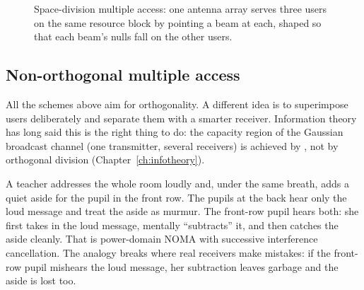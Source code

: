 \begin{figure}[H]\centering
{}
\caption{Space-division multiple access: one antenna array serves three users on the same resource block
by pointing a beam at each, shaped so that each beam's nulls fall on the other users.}
\label{fig:ch20_sdma}
\end{figure}

\subsection{Non-orthogonal multiple access}

All the schemes above aim for orthogonality. A different idea is to superimpose users deliberately
and separate them with a smarter receiver. Information theory has long said this is the right thing
to do: the capacity region of the Gaussian broadcast channel (one transmitter, several receivers)
is achieved by , not by orthogonal division (Chapter~\ref{ch:infotheory}).

\begin{analogy}
A teacher addresses the whole room loudly and, under the same breath, adds a quiet aside for the
pupil in the front row. The pupils at the back hear only the loud message and treat the aside as
murmur. The front-row pupil hears both: she first takes in the loud message, mentally ``subtracts''
it, and then catches the aside cleanly. That is power-domain NOMA with successive interference
cancellation. The analogy breaks where real receivers make mistakes: if the front-row pupil mishears
the loud message, her subtraction leaves garbage and the aside is lost too.
\end{analogy}

